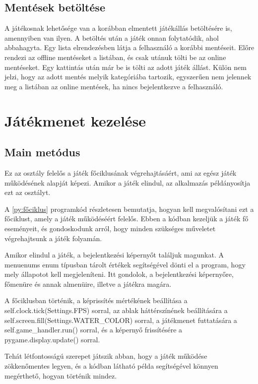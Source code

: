 \subsection{Mentések betöltése}
 A játékosnak lehetősége van a korábban elmentett játékállás betöltésére is, amennyiben van ilyen. A betöltés után a játék onnan folytatódik, ahol abbahagyta. Egy lista elrendezésben látja a felhasználó a korábbi mentéseit. Előre rendezi az offline mentéseket a listában, és csak utánuk tölti be az online mentéseket. Egy kattintás után már be is tölti az adott játék állást. Külön nem jelzi, hogy az adott mentés melyik kategóriába tartozik, egyszerűen nem jelennek meg a listában az online mentések, ha nincs bejelentkezve a felhasználó.

\section{Játékmenet kezelése}

\subsection{Main metódus}
 Ez az osztály felelős a játék főciklusának végrehajtásáért, ami az egész játék működésének alapját képezi. Amikor a játék elindul, az alkalmazás példányosítja ezt az osztályt.

A \ref{py:főciklus} programkód részletesen bemutatja, hogyan kell megvalósítani ezt a főciklust, amely a játék működéséért felelős. Ebben a kódban kezeljük a játék fő eseményeit, és gondoskodunk arról, hogy minden szükséges műveletet végrehajtsunk a játék folyamán.

Amikor elindul a játék, a bejelentkezési képernyőt találjuk magunkat. A menuenums enum típusban tárolt értékek segítségével dönti el a program, hogy mely állapotot kell megjeleníteni. Itt gondolok, a bejelentkezési képernyőre, főmenüre és annak almenüire, illetve a játékra magára. 

A főciklusban történik, a képrissítés mértékének beállítása a self.clock.tick(Settings.FPS) sorral, az ablak háttérszínének beállítására a self.screen.fill(Settings.WATER\_COLOR) sorral, a játékmenet futtatására a self.game\_handler.run() sorral, és a képernyő frissítésére a pygame.display.update() sorral.

Tehát létfontosságú szerepet játszik abban, hogy a játék működése zökkenőmentes legyen, és a kódban látható példa segítségével könnyen megérthető, hogyan történik mindez.


